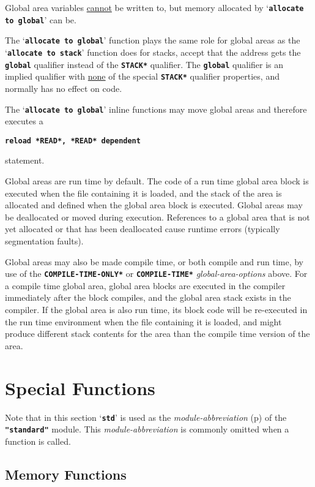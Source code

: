 \documentclass[12pt]{article}
\newcommand{\TT}[1]{{\tt \bfseries #1}}
\newcommand{\pagref}[1]{p\pageref{#1}}
\newcommand{\EOL}{\penalty \exhyphenpenalty}
\begin{document}
Global area variables \underline{cannot} be written to, but memory allocated
by `\TT{allocate to global}' can be.

The `\TT{allocate to global}' function plays the same role for
global areas as the `\TT{allocate to stack}' function does for
stacks, accept that the address gets the \TT{global} qualifier
instead of the \TT{*STACK*} qualifier.  The \TT{global} qualifier
is an implied qualifier
with \underline{none} of the special \TT{*STACK*}
qualifier properties, and normally has no effect on code.

The `\TT{allocate to global}' inline functions may move
global areas and therefore executes a
\begin{center}
\TT{reload *READ*, *READ* dependent}
\end{center}
statement.

Global areas are run time by default.
The code of a run time
global area block is executed when the file containing it is
loaded, and the stack of the area is allocated and defined when
the global area block is executed.
Global areas may be deallocated or moved during execution.
References to a global area
that is not yet allocated or that has been deallocated cause runtime
errors (typically segmentation faults).

Global areas may also be made compile time, or both compile and run time,
by use of the \TT{*COM\-PILE-\EOL TIME-\EOL ONLY*} or \TT{*COMPILE-\EOL TIME*}
{\em global-\EOL area-\EOL options} above.  For a compile time
global area, global area blocks are executed in the compiler immediately
after the block compiles, and the global area stack exists in the compiler.
If the global area is also run time, its
block code will be re-executed in the run time environment when the
file containing it is loaded, and might produce different stack contents
for the area than the compile time version of the area.

\section{Special Functions}
\label{SPECIAL-FUNCTIONS}

Note that in this section `\TT{std}' is used as the
{\em module-abbreviation} (\pagref{MODULE-ABBREVIATION})
of the \TT{"standard"} module.
This {\em module-abbreviation} is commonly omitted when
a function is called.

\subsection{Memory Functions}
\label{MEMORY-FUNCTIONS}
\end{document}
